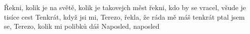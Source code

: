 \repeatingchorus{}
\beginchorus{}
\chordsoff{}
Řekni, kolik je na světě, kolik je takovejch měst
řekni, kdo by se vracel, všude je tisíce cest
Tenkrát, když jsi mi, Terezo, řekla, že ráda mě máš
tenkrát ptal jsem se, Terezo, kolik mi polibků dáš
Naposled, naposled
\chordson{}
\endchorus{}

\endsong{}
